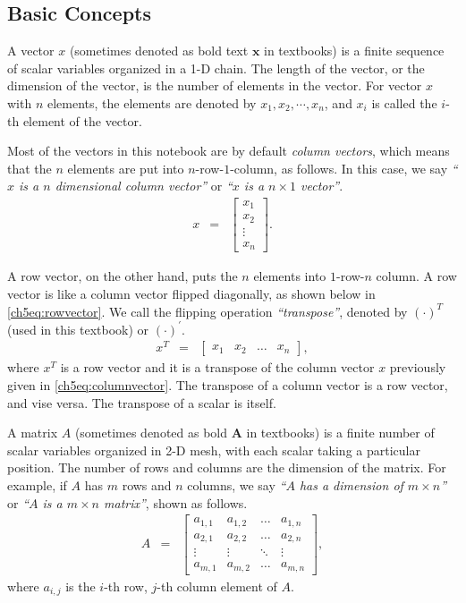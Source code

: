 \subsection{Basic Concepts}

A vector $x$ (sometimes denoted as bold text $\textbf{x}$ in textbooks) is a finite sequence of scalar variables organized in a 1-D chain. The length of the vector, or the dimension of the vector, is the number of elements in the vector. For vector $x$ with $n$ elements, the elements are denoted by $x_1, x_2, \cdots, x_n$, and $x_i$ is called the $i$-th element of the vector.

Most of the vectors in this notebook are by default \textit{column vectors}, which means that the $n$ elements are put into $n$-row-$1$-column, as follows. In this case, we say \textit{``$x$ is a $n$ dimensional column vector''} or \textit{``$x$ is a $n\times 1$ vector''}.
\begin{eqnarray}
    x &=& \left[\begin{array}{cc}
         x_1  \\
         x_2 \\
         \vdots \\
         x_n
    \end{array}\right]. \label{ch5eq:columnvector}
\end{eqnarray}

A row vector, on the other hand, puts the $n$ elements into $1$-row-$n$ column. A row vector is like a column vector flipped diagonally, as shown below in \eqref{ch5eq:rowvector}. We call the flipping operation \textit{``transpose''}, denoted by $(\cdot)^T$ (used in this textbook) or $(\cdot)^\prime$.
\begin{eqnarray}
    x^T &=& \left[\begin{array}{cccc} x_1 & x_2 & \ldots & x_n
    \end{array}\right], \label{ch5eq:rowvector}
\end{eqnarray}
where $x^T$ is a row vector and it is a transpose of the column vector $x$ previously given in \eqref{ch5eq:columnvector}. The transpose of a column vector is a row vector, and vise versa. The transpose of a scalar is itself.

A matrix $A$ (sometimes denoted as bold $\textbf{A}$ in textbooks) is a finite number of scalar variables organized in 2-D mesh, with each scalar taking a particular position. The number of rows and columns are the dimension of the matrix. For example, if $A$ has $m$ rows and $n$ columns, we say \textit{``$A$ has a dimension of $m\times n$''} or \textit{``$A$ is a $m\times n$ matrix''}, shown as follows.
\begin{eqnarray}
    A &=& \left[\begin{array}{cccc}
        a_{1,1} & a_{1,2} & \ldots & a_{1,n} \\
        a_{2,1} & a_{2,2} & \ldots & a_{2,n} \\
        \vdots & \vdots & \ddots & \vdots \\
        a_{m,1} & a_{m,2} & \ldots & a_{m,n}
    \end{array}\right], \label{ch5eq:matrixa}
\end{eqnarray}
where $a_{i,j}$ is the $i$-th row, $j$-th column element of $A$.

